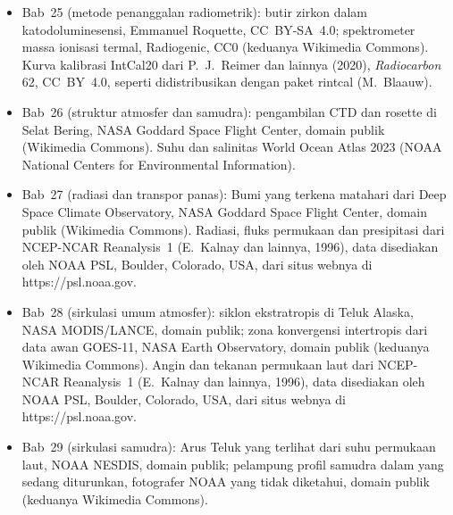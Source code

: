 \begin{itemize}
  \item Bab~25 (metode penanggalan radiometrik): butir zirkon dalam katodoluminesensi, Emmanuel Roquette, CC~BY-SA~4.0; spektrometer massa ionisasi termal, Radiogenic, CC0 (keduanya Wikimedia Commons). Kurva kalibrasi IntCal20 dari P.~J.~Reimer dan lainnya (2020), \emph{Radiocarbon} 62, CC~BY~4.0, seperti didistribusikan dengan paket rintcal (M.~Blaauw).
  \item Bab~26 (struktur atmosfer dan samudra): pengambilan CTD dan rosette di Selat Bering, NASA Goddard Space Flight Center, domain publik (Wikimedia Commons). Suhu dan salinitas World Ocean Atlas 2023 (NOAA National Centers for Environmental Information).
  \item Bab~27 (radiasi dan transpor panas): Bumi yang terkena matahari dari Deep Space Climate Observatory, NASA Goddard Space Flight Center, domain publik (Wikimedia Commons). Radiasi, fluks permukaan dan presipitasi dari NCEP-NCAR Reanalysis~1 (E.~Kalnay dan lainnya, 1996), data disediakan oleh NOAA PSL, Boulder, Colorado, USA, dari situs webnya di https://psl.noaa.gov.
  \item Bab~28 (sirkulasi umum atmosfer): siklon ekstratropis di Teluk Alaska, NASA MODIS/LANCE, domain publik; zona konvergensi intertropis dari data awan GOES-11, NASA Earth Observatory, domain publik (keduanya Wikimedia Commons). Angin dan tekanan permukaan laut dari NCEP-NCAR Reanalysis~1 (E.~Kalnay dan lainnya, 1996), data disediakan oleh NOAA PSL, Boulder, Colorado, USA, dari situs webnya di https://psl.noaa.gov.
  \item Bab~29 (sirkulasi samudra): Arus Teluk yang terlihat dari suhu permukaan laut, NOAA NESDIS, domain publik; pelampung profil samudra dalam yang sedang diturunkan, fotografer NOAA yang tidak diketahui, domain publik (keduanya Wikimedia Commons).
\end{itemize}
